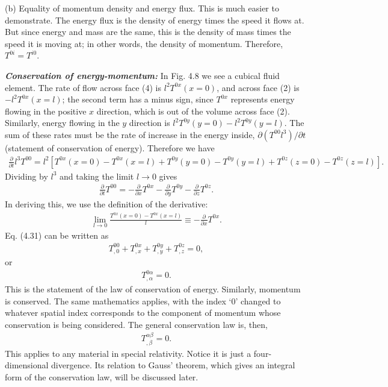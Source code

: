 \documentclass[11pt,letterpaper]{book}
\begin{document}
    (b) Equality of momentum density and energy flux. This is much easier to demonstrate. The energy flux is the density of energy times the speed it flows at. But since energy and mass are the same, this is the density of mass times the speed it is moving at; in other words, the density of momentum. Therefore, \(T^{0i} = T^{i0}\).

    \textbf{\textit{Conservation of energy-momentum:}}
    In Fig. 4.8 we see a cubical fluid element. The rate of flow across face (4) is \(l^2 T^{0x}(x = 0)\), and across face (2) is \(-l^2 T^{0x}(x = l)\); the second term has a minus sign, since \(T^{0x}\) represents energy flowing in the positive \(x\) direction, which is out of the volume across face (2). Similarly, energy flowing in the \(y\) direction is \(l^2 T^{0y}(y = 0) - l^2 T^{0y}(y = l)\). The sum of these rates must be the rate of increase in the energy inside, \(\partial(T^{00} l^3)/\partial t\) (statement of conservation of energy). Therefore we have
    \begin{align}
    \frac{\partial}{\partial t} l^3 T^{00} = l^2 \left[ T^{0x}(x = 0) - T^{0x}(x = l) + T^{0y}(y = 0) - T^{0y}(y = l) + T^{0z}(z = 0) - T^{0z}(z = l) \right]. \tag{4.30}
    \end{align}
    Dividing by \(l^3\) and taking the limit \(l \to 0\) gives
    \begin{align}
    \frac{\partial}{\partial t} T^{00} = - \frac{\partial}{\partial x} T^{0x} - \frac{\partial}{\partial y} T^{0y} - \frac{\partial}{\partial z} T^{0z}. \tag{4.31}
    \end{align}
    In deriving this, we use the definition of the derivative:
    \begin{align}
    \lim_{l \to 0} \frac{T^{0x}(x = 0) - T^{0x}(x = l)}{l} \equiv - \frac{\partial}{\partial x} T^{0x}. \tag{4.32}
    \end{align}
    Eq. (4.31) can be written as
    \begin{align}
    T^{00}_{,0} + T^{0x}_{,x} + T^{0y}_{,y} + T^{0z}_{,z} = 0,
    \end{align}
    or
    \begin{align}
    T^{0\alpha}_{,\alpha} = 0. \tag{4.33}
    \end{align}
    This is the statement of the law of conservation of energy. Similarly, momentum is conserved. The same mathematics applies, with the index ‘0’ changed to whatever spatial index corresponds to the component of momentum whose conservation is being considered. The general conservation law is, then,
    \begin{align}
    T^{\alpha\beta}_{,\beta} = 0. \tag{4.34}
    \end{align}
    This applies to any material in special relativity. Notice it is just a four-dimensional divergence. Its relation to Gauss’ theorem, which gives an integral form of the conservation law, will be discussed later.
\end{document}

